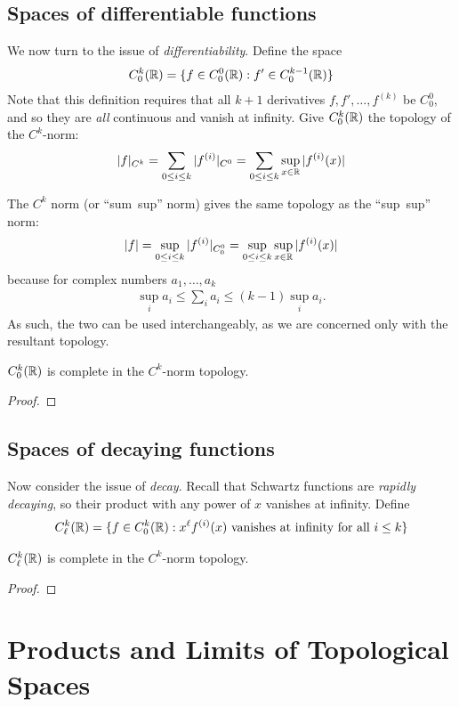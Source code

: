     \subsection{Spaces of differentiable functions}
      We now turn to the issue of \emph{differentiability}.
      Define the space 
      \begin{align*}
        C^k_0(\mathbb{R}) = \{f\in C^0_0(\mathbb{R}) : f'\in C^{k-1}_0(\mathbb{R})\}
      \end{align*}
      Note that this definition requires that all $k+1$ derivatives $f,f',\ldots,f^{(k)}$ be $C^0_0$, and so they are \emph{all} continuous and vanish at infinity.
      Give $C^k_0(\mathbb{R})$ the topology of the $C^k$-norm:
      \begin{align*}
        |f|_{C^k} = \sum_{0\le i\le k} |f^{(i)}|_{C^0} = \sum_{0\le i\le k} \sup_{x\in\mathbb{R}}|f^{(i)}(x)|
      \end{align*}
      \begin{rmk}
        The $C^k$ norm (or ``sum~sup'' norm) gives the same topology as the ``sup~sup'' norm:
        \begin{align*}
          |f|=\sup_{0\le i\le k}|f^{(i)}|_{C^0_0}=\sup_{0\le i\le k}\sup_{x\in\mathbb{R}}|f^{(i)}(x)|
        \end{align*}
        because for complex numbers $a_1,\ldots,a_k$
        \begin{align*}
          \sup_i a_i \le \sum_i a_i \le (k-1) \sup_i a_i\text{.}
        \end{align*}
        As such, the two can be used interchangeably, as we are concerned only with the resultant topology.
      \end{rmk}
      \begin{rmk}
      \end{rmk}
      \begin{thm}
        $C^k_0(\mathbb{R})$ is complete in the $C^k$-norm topology.
        \begin{proof}
        \end{proof}
      \end{thm}

    \subsection{Spaces of decaying functions}
      Now consider the issue of \emph{decay}.
      Recall that Schwartz functions are \emph{rapidly decaying}, so their product with any power of $x$ vanishes at infinity.
      Define
      \begin{align*}
        C^k_\ell(\mathbb{R}) = \{f\in C^k_0(\mathbb{R}):x^\ell f^{(i)}(x)\text{ vanishes at infinity for all } i\le k\}
      \end{align*}
      \begin{thm}
        $C^k_\ell(\mathbb{R})$ is complete in the $C^k$-norm topology.
        \begin{proof}
        \end{proof}
      \end{thm}

    \section{Products and Limits of Topological Spaces}


